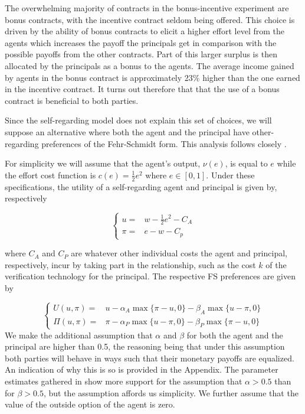 \documentclass[12pt]{article}
\begin{document}
The overwhelming majority of contracts in the bonus-incentive experiment are bonus contracts, with the incentive contract seldom being offered. This choice is driven by the ability of bonus contracts to elicit a higher effort level from the agents which increases the payoff the principals get in comparison with the possible payoffs from the other contracts. Part of this larger surplus is then allocated by the principals as a bonus to the agents. The average income gained by agents in the bonus contract is approximately 23\% higher than the one earned in the incentive contract. It turns out therefore that that the use of a bonus contract is beneficial to both parties.

Since the self-regarding model does not explain this set of choices, we will suppose an alternative where both the agent and the principal have other-regarding preferences of the Fehr-Schmidt form. This analysis follows closely \cite{dhami2016foundations}. 

For simplicity we will assume that the agent's output, $\nu(e)$, is equal to $e$ while the effort cost function is $c(e)=\frac{1}{2}e^2$ where $e\in[0,1]$. Under these specifications, the utility of a self-regarding agent and principal is given by, respectively

\begin{equation}
	\left\{\begin{matrix}
	u =  & w - \frac{1}{2} e^2 - C_A\\ 
	\pi= & e - w - C_p
	\end{matrix}\right.
\end{equation}

\noindent
where $C_A$ and $C_P$ are whatever other individual costs the agent and principal, respectively, incur by taking part in the relationship, such as the cost $k$ of the verification technology for the principal. The respective FS preferences are given by


\begin{equation}
\left\{\begin{matrix}
U\left(u,\pi\right) =  &  u - \alpha_A \max\{\pi-u,0\}-\beta_A \max\{u-\pi,0\}\\ 
\Pi \left(u,\pi\right)= & \pi - \alpha_P \max\{u-\pi,0\}-\beta_P \max\{\pi-u,0\}
\end{matrix}\right.
\end{equation}
We make the additional assumption that $\alpha$ and $\beta$ for both the agent and the principal are higher than 0.5, the reasoning being that under this assumption both parties will behave in ways such that their monetary payoffs are equalized. An indication of why this is so is provided in the Appendix. The parameter estimates gathered in \cite{Eckel2010} show more support for the assumption that $\alpha >0.5$ than for $\beta > 0.5$, but the assumption affords us simplicity. We further assume that the value of the outside option of the agent is zero.
\end{document}
